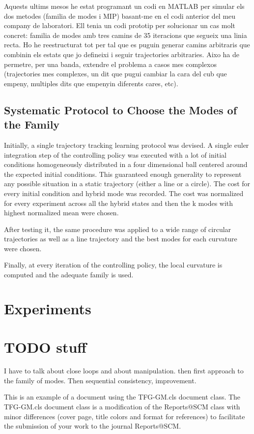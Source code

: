 \documentclass[12,twoside]{TFG-GM}
\theoremstyle{definition}
\theoremstyle{remark}
\begin{document}
Aquests ultims mesos he estat programant un codi en MATLAB per simular els dos metodes (familia de modes i MIP) basant-me en el codi anterior del meu company de laboratori. Ell tenia un codi prototip per solucionar un cas molt concret: familia de modes amb tres camins de 35 iteracions que segueix una linia recta. Ho he reestructurat tot per tal que es puguin generar camins arbitraris que combinin els estats que jo defineixi i seguir trajectories arbitraries. Aixo ha de permetre, per una banda, extendre el problema a casos mes complexos (trajectories mes complexes, un dit que pugui cambiar la cara del cub que empeny, multiples dits que empenyin diferents cares, etc). 

\subsection{Systematic Protocol to Choose the Modes of the Family}
Initially, a single trajectory tracking learning protocol was devised. A single euler integration step of the controlling policy was executed with a lot of initial conditions homogeneously distributed in a four dimensional ball centered around the expected initial conditions. This guaranteed enough generality to represent any possible situation in a static trajectory (either a line or a circle). The cost for every initial condition and hybrid mode was recorded. The cost was normalized for every experiment across all the hybrid states and then the k modes with highest normalized mean were chosen.

After testing it, the same procedure was applied to a wide range of circular trajectories as well as a line trajectory and the best modes for each curvature were chosen.

Finally, at every iteration of the controlling policy, the local curvature is computed and the adequate family is used.

\section{Experiments}
\label{sec:experiments}

\section{TODO stuff}
I have to talk about close loops and about manipulation. then first approach to the family of modes. Then sequential consistency, improvement.

This is an example of a document using the TFG-GM.cls document class. The TFG-GM.cls document class is a modification of the Reports@SCM class with minor differences (cover page, title colors and format for references) to facilitate the submission of your work to the journal Reports@SCM.
\end{document}
